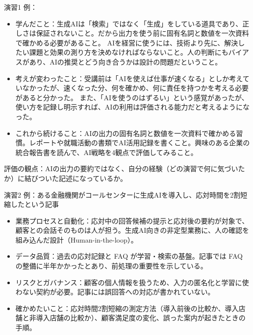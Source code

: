 \begin{answer}{演習1}
例：
\begin{itemize}
  \item 学んだこと：生成AIは「検索」ではなく「生成」をしている道具であり、正しさは保証されないこと。だから出力を使う前に固有名詞と数値を一次資料で確かめる必要があること。
        AIを経営に使うには、技術より先に、解決したい課題と効果の測り方を決めなければならないこと。人の判断にもバイアスがあり、AIの推奨とどう向き合うかは設計の問題だということ。
  \item 考えが変わったこと：受講前は「AIを使えば仕事が速くなる」としか考えていなかったが、速くなった分、何を確かめ、何に責任を持つかを考える必要があると分かった。
        また、「AIを使うのはずるい」という感覚があったが、使い方を記録し明示すれば、AIの利用は評価される能力だと考えるようになった。
  \item これから続けること：AIの出力の固有名詞と数値を一次資料で確かめる習慣。レポートや就職活動の書類でAI活用記録を書くこと。興味のある企業の統合報告書を読んで、AI戦略を4観点で評価してみること。
\end{itemize}
評価の観点：AIの出力の要約ではなく、自分の経験（どの演習で何に気づいたか）に結びついた記述になっているか。
\end{answer}

\begin{answer}{演習2}
例：ある金融機関がコールセンターに生成AIを導入し、応対時間を2割短縮したという記事
\begin{itemize}
  \item 業務プロセスと自動化：応対中の回答候補の提示と応対後の要約が対象で、顧客との会話そのものは人が担う。生成AI向きの非定型業務に、人の確認を組み込んだ設計（Human-in-the-loop）。
  \item データ品質：過去の応対記録と FAQ が学習・検索の基盤。記事では FAQ の整備に半年かかったとあり、前処理の重要性を示している。
  \item リスクとガバナンス：顧客の個人情報を扱うため、入力の匿名化と学習に使わない契約が必要。記事には誤回答への対応が書かれていない。
  \item 確かめたいこと：応対時間2割短縮の測定方法（導入前後の比較か、導入店舗と非導入店舗の比較か）、顧客満足度の変化、誤った案内が起きたときの手順。
\end{itemize}
\end{answer}

